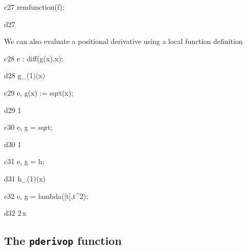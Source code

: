 \documentclass[12pt]{article}
\begin{document}
\begin{mcline}{c27}
   remfunction(f);
\end{mcline}



\begin{mdline}{d27}
   \left[ f \right] 
\end{mdline}


\noindent We can also evaluate a positional derivative using a local 
function definition


\begin{mcline}{c28}
     e : diff(g(x),x);
\end{mcline}



\begin{mdline}{d28}
   g_{\left(1\right)}(x)
\end{mdline}

\begin{mcline}{c29}
   e, g(x) := sqrt(x);
\end{mcline}



\begin{mdline}{d29}
   {{1}}
\end{mdline}

\begin{mcline}{c30}
   e, g = sqrt;
\end{mcline}



\begin{mdline}{d30}
   {{1}}
\end{mdline}

\begin{mcline}{c31}
   e, g = h;
\end{mcline}



\begin{mdline}{d31}
   h_{\left(1\right)}(x)
\end{mdline}

\begin{mcline}{c32}
   e, g = lambda([t],t^2);
\end{mcline}



\begin{mdline}{d32}
   2\,x
\end{mdline}


\subsection*{The {\tt pderivop} function}
\end{document}
